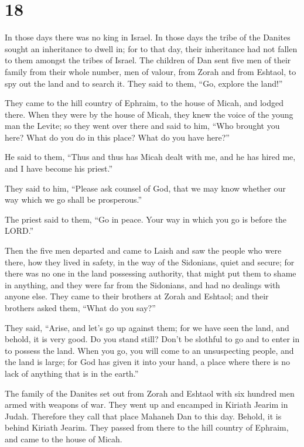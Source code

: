 \hypertarget{section-17}{%
\section{18}\label{section-17}}

 In those days there was no king in Israel. In those days
the tribe of the Danites sought an inheritance to dwell in; for to that
day, their inheritance had not fallen to them amongst the tribes of
Israel.  The children of Dan sent five men of their family
from their whole number, men of valour, from Zorah and from Eshtaol, to
spy out the land and to search it. They said to them, ``Go, explore the
land!''

They came to the hill country of Ephraim, to the house of Micah, and
lodged there.  When they were by the house of Micah, they
knew the voice of the young man the Levite; so they went over there and
said to him, ``Who brought you here? What do you do in this place? What
do you have here?''

 He said to them, ``Thus and thus has Micah dealt with me,
and he has hired me, and I have become his priest.''

 They said to him, ``Please ask counsel of God, that we may
know whether our way which we go shall be prosperous.''

 The priest said to them, ``Go in peace. Your way in which
you go is before the LORD.''

 Then the five men departed and came to Laish and saw the
people who were there, how they lived in safety, in the way of the
Sidonians, quiet and secure; for there was no one in the land possessing
authority, that might put them to shame in anything, and they were far
from the Sidonians, and had no dealings with anyone else. 
They came to their brothers at Zorah and Eshtaol; and their brothers
asked them, ``What do you say?''

 They said, ``Arise, and let's go up against them; for we
have seen the land, and behold, it is very good. Do you stand still?
Don't be slothful to go and to enter in to possess the land.
 When you go, you will come to an unsuspecting people, and
the land is large; for God has given it into your hand, a place where
there is no lack of anything that is in the earth.''

 The family of the Danites set out from Zorah and Eshtaol
with six hundred men armed with weapons of war.  They went
up and encamped in Kiriath Jearim in Judah. Therefore they call that
place Mahaneh Dan to this day. Behold, it is behind Kiriath Jearim.
 They passed from there to the hill country of Ephraim, and
came to the house of Micah.

